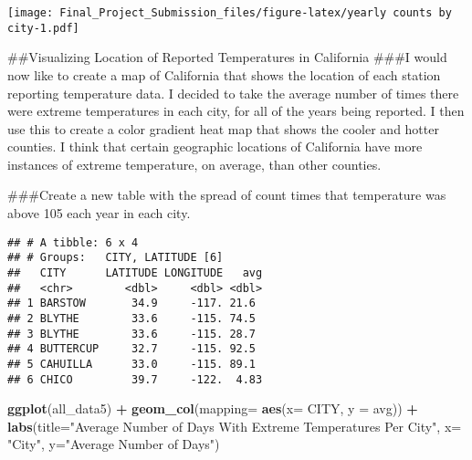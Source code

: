 \documentclass[]{article}
\newenvironment{Shaded}{\begin{snugshade}}{\end{snugshade}}
\newcommand{\DataTypeTok}[1]{\textcolor[rgb]{0.13,0.29,0.53}{#1}}
\newcommand{\DecValTok}[1]{\textcolor[rgb]{0.00,0.00,0.81}{#1}}
\newcommand{\KeywordTok}[1]{\textcolor[rgb]{0.13,0.29,0.53}{\textbf{#1}}}
\newcommand{\NormalTok}[1]{#1}
\newcommand{\OperatorTok}[1]{\textcolor[rgb]{0.81,0.36,0.00}{\textbf{#1}}}
\newcommand{\StringTok}[1]{\textcolor[rgb]{0.31,0.60,0.02}{#1}}
\begin{document}
\texttt{[image: Final\_Project\_Submission\_files/figure-latex/yearly counts by city-1.pdf]}

\#\#Visualizing Location of Reported Temperatures in California \#\#\#I
would now like to create a map of California that shows the location of
each station reporting temperature data. I decided to take the average
number of times there were extreme temperatures in each city, for all of
the years being reported. I then use this to create a color gradient
heat map that shows the cooler and hotter counties. I think that certain
geographic locations of California have more instances of extreme
temperature, on average, than other counties.

\#\#\#Create a new table with the spread of count times that temperature
was above 105 each year in each city.

\begin{Shaded}
\end{Shaded}

\begin{verbatim}
## # A tibble: 6 x 4
## # Groups:   CITY, LATITUDE [6]
##   CITY      LATITUDE LONGITUDE   avg
##   <chr>        <dbl>     <dbl> <dbl>
## 1 BARSTOW       34.9     -117. 21.6 
## 2 BLYTHE        33.6     -115. 74.5 
## 3 BLYTHE        33.6     -115. 28.7 
## 4 BUTTERCUP     32.7     -115. 92.5 
## 5 CAHUILLA      33.0     -115. 89.1 
## 6 CHICO         39.7     -122.  4.83
\end{verbatim}

\begin{Shaded}
\begin{Highlighting}[]
\KeywordTok{ggplot}\NormalTok{(all_data5) }\OperatorTok{+}
\StringTok{  }\KeywordTok{geom_col}\NormalTok{(}\DataTypeTok{mapping=} \KeywordTok{aes}\NormalTok{(}\DataTypeTok{x=}\NormalTok{ CITY, }\DataTypeTok{y =}\NormalTok{ avg)) }\OperatorTok{+}
\StringTok{  }\KeywordTok{labs}\NormalTok{(}\DataTypeTok{title=}\StringTok{"Average Number of Days With Extreme Temperatures Per City"}\NormalTok{, }\DataTypeTok{x=} \StringTok{"City"}\NormalTok{, }\DataTypeTok{y=}\StringTok{"Average Number of Days"}\NormalTok{)}
\end{Highlighting}
\end{Shaded}
\end{document}
